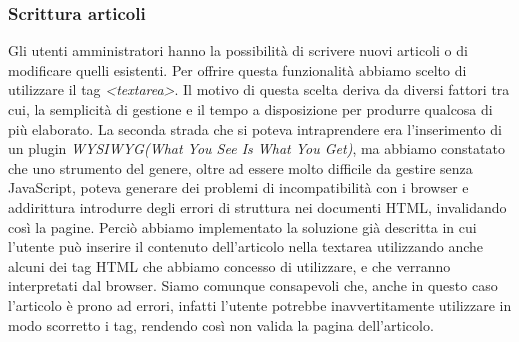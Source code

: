 \documentclass[12pt]{article}
\begin{document}
	\subsubsection{Scrittura articoli}
	Gli utenti amministratori hanno la possibilità di scrivere nuovi articoli o di modificare quelli esistenti. Per offrire questa funzionalità abbiamo scelto di utilizzare il tag \emph{<textarea>}. Il motivo di questa scelta deriva da diversi fattori tra cui, la semplicità di gestione e il tempo a disposizione per produrre qualcosa di più elaborato. La seconda strada che si poteva intraprendere era l'inserimento di un plugin \emph{WYSIWYG(What You See Is What You Get)}, ma abbiamo constatato che uno strumento del genere, oltre ad essere molto difficile da gestire senza JavaScript, poteva generare dei problemi di incompatibilità con i browser e addirittura introdurre degli errori di struttura nei documenti HTML, invalidando così la pagine. Perciò abbiamo implementato la soluzione già descritta in cui l'utente può inserire il contenuto dell'articolo nella textarea utilizzando anche alcuni dei tag HTML che abbiamo concesso di utilizzare, e che verranno interpretati dal browser. Siamo comunque consapevoli che, anche in questo caso l'articolo è prono ad errori, infatti l'utente potrebbe inavvertitamente utilizzare in modo scorretto i tag, rendendo così non valida la pagina dell'articolo.
\end{document}
